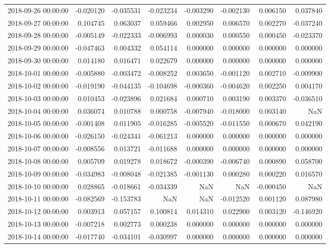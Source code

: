 \begin{tabular}{lrrrrrrr}
2018-09-26 00:00:00 & -0.020120 & -0.035531 & -0.023234 & -0.003290 & -0.002130 & 0.006150 & 0.037840 \\
2018-09-27 00:00:00 & 0.104745 & 0.063037 & 0.059466 & 0.002950 & 0.006570 & 0.002270 & -0.037240 \\
2018-09-28 00:00:00 & -0.005149 & -0.022333 & -0.006993 & 0.000030 & 0.000550 & 0.000450 & -0.023370 \\
2018-09-29 00:00:00 & -0.047463 & 0.004332 & 0.054114 & 0.000000 & 0.000000 & 0.000000 & 0.000000 \\
2018-09-30 00:00:00 & 0.014180 & 0.016471 & 0.022679 & 0.000000 & 0.000000 & 0.000000 & 0.000000 \\
2018-10-01 00:00:00 & -0.005880 & -0.003472 & -0.008252 & 0.003650 & -0.001120 & 0.002710 & -0.009900 \\
2018-10-02 00:00:00 & -0.019190 & -0.044135 & -0.104698 & -0.000360 & -0.004620 & 0.002250 & 0.004170 \\
2018-10-03 00:00:00 & 0.010453 & -0.023896 & 0.021684 & 0.000710 & 0.003190 & 0.003370 & -0.036510 \\
2018-10-04 00:00:00 & 0.036074 & 0.010788 & 0.000758 & -0.007940 & -0.018000 & 0.003140 & NaN \\
2018-10-05 00:00:00 & -0.001408 & 0.011905 & -0.016285 & -0.005520 & -0.011550 & 0.000670 & 0.042190 \\
2018-10-06 00:00:00 & -0.026150 & -0.024341 & -0.061213 & 0.000000 & 0.000000 & 0.000000 & 0.000000 \\
2018-10-07 00:00:00 & -0.008556 & 0.013721 & -0.011688 & 0.000000 & 0.000000 & 0.000000 & 0.000000 \\
2018-10-08 00:00:00 & 0.005709 & 0.019278 & 0.018672 & -0.000390 & -0.006740 & 0.000890 & 0.058700 \\
2018-10-09 00:00:00 & -0.034983 & -0.008048 & -0.021385 & -0.001130 & 0.000280 & 0.000220 & 0.016570 \\
2018-10-10 00:00:00 & 0.028865 & -0.018661 & -0.034339 & NaN & NaN & -0.000450 & NaN \\
2018-10-11 00:00:00 & -0.082569 & -0.153783 & NaN & NaN & -0.012520 & 0.001120 & 0.087980 \\
2018-10-12 00:00:00 & 0.003913 & 0.057157 & 0.100814 & 0.014310 & 0.022900 & 0.003120 & -0.146920 \\
2018-10-13 00:00:00 & -0.007218 & 0.002773 & 0.000238 & 0.000000 & 0.000000 & 0.000000 & 0.000000 \\
2018-10-14 00:00:00 & -0.017740 & -0.034101 & -0.030997 & 0.000000 & 0.000000 & 0.000000 & 0.000000 \\

\end{tabular}
